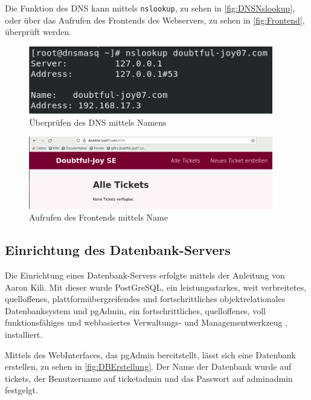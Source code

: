 \documentclass[a4paper,
    11pt,
    headings=small,
    ngerman,
    listof=totoc,
    numbers=noenddot]{scrreprt}[2021/11/13]
\begin{document}
Die Funktion des \ac{DNS} kann mittels \texttt{nslookup}, zu sehen in \vref{fig:DNSNslookup}, oder über das Aufrufen des Frontends des Webservers, zu sehen in \vref{fig:Frontend}, überprüft werden.

\begin{figure}[htbp]
  \centering
  \includegraphics[width=0.95\textwidth]{data/dns-works-nslookup.png}
  \caption{Überprüfen des DNS mittels Namens}
  \label{fig:DNSNslookup}
\end{figure}

\begin{figure}[htbp]
  \centering
  \includegraphics[width=0.95\textwidth]{data/dns-names-working.png}
  \caption{Aufrufen des Frontends mittels Name}
  \label{fig:Frontend}
\end{figure}


\subsection{Einrichtung des Datenbank-Servers}

Die Einrichtung eines Datenbank-Servers erfolgte mittels der Anleitung von Aaron Kili. \autocite{tecmint:PostgreSQLAndpgAdmin} Mit dieser wurde PostGreSQL, ein \glqq{}leistungsstarkes, weit verbreitetes, quelloffenes, plattformübergreifendes und fortschrittliches objektrelationales Datenbanksystem\grqq{} \autocite{tecmint:PostgreSQLAndpgAdmin} und pgAdmin, ein \glqq{}fortschrittliches, quelloffenes, voll funktionsfähiges und webbasiertes Verwaltungs- und Managementwerkzeug\grqq{} \autocite{tecmint:PostgreSQLAndpgAdmin}, installiert.

Mittels des WebInterfaces, das pgAdmin bereitstellt, lässt sich eine Datenbank erstellen, zu sehen in \vref{fig:DBErstellung}. Der Name der Datenbank wurde auf \glqq{}tickets\grqq{}, der Benutzername auf \glqq{}ticketadmin\grqq{} und das Passwort auf \glqq{}adminadmin\grqq{} festgelgt.
\end{document}
